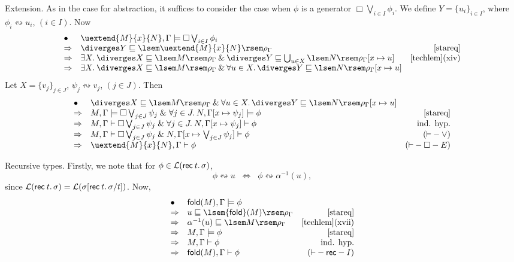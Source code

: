 Extension.
As in the case for abstraction, it suffices to consider the case when $\phi$ is a generator $\Box \bigvee_{i \in I}\phi_{i}$.
We define $Y = \{ u_{i} \}_{i \in I}$, where $\phi_{i} \leftrightsquigarrow u_{i}$, $(i \in I)$.
Now
\[ \begin{array}{llr}
\bullet & \uextend{M}{x}{N}, \Gamma \models \Box \bigvee_{i \in I} \phi_{i} & \\
\Rightarrow & \diverges Y \sqsubseteq \lsem \uextend{M}{x}{N} \rsem \rho_{\Gamma} & \ref{stareq} \\
\Rightarrow & \exists X. \: \diverges X \sqsubseteq \lsem M \rsem \rho_{\Gamma} \: \& \: \diverges Y \sqsubseteq \bigcup_{u \in X} \lsem N \rsem \rho_{\Gamma}[x \mapsto u] & \mbox{\ref{techlem}(xiv)} \\
\Rightarrow & \exists X. \: \diverges X \sqsubseteq \lsem M \rsem \rho_{\Gamma} \: \& \: \forall u \in X. \, \diverges Y \sqsubseteq \lsem N \rsem \rho_{\Gamma}[x \mapsto u] & 
\end{array} \]
Let $X = \{ v_{j} \}_{j \in J}$, $\psi_{j} \leftrightsquigarrow v_{j}$, $(j \in J)$. Then
\[ \begin{array}{llr}
\bullet &  \diverges X \sqsubseteq \lsem M \rsem \rho_{\Gamma} \: \& \: \forall u \in X. \, \diverges Y \sqsubseteq \lsem N \rsem \rho_{\Gamma}[x \mapsto u] & \\
\Rightarrow & M, \Gamma \models \Box \bigvee_{j \in J} \psi_{j} \; \& \; \forall j \in J. \: N, \Gamma [x \mapsto \psi_{j}] \models \phi & \ref{stareq} \\
\Rightarrow & M, \Gamma \vdash \Box \bigvee_{j \in J} \psi_{j} \; \& \; \forall j \in J. \: N, \Gamma [x \mapsto \psi_{j}] \vdash \phi & \mbox{ind. hyp.} \\
\Rightarrow & M, \Gamma \vdash \Box \bigvee_{j \in J} \psi_{j} \; \& \; N, \Gamma [x \mapsto \bigvee_{j \in J} \psi_{j}] \vdash \phi & ({\vdash}-{\vee}) \\
\Rightarrow & \uextend{M}{x}{N}, \Gamma \vdash  \phi & ({\vdash}-{\Box}-E)
\end{array} \]

Recursive types.
Firstly, we note that for $\phi \in {\cal L}({\sf rec} \: t. \, \sigma )$,
\[ \phi \leftrightsquigarrow u \;\; \Leftrightarrow \;\; \phi \leftrightsquigarrow \alpha^{-1}(u) , \]
since ${\cal L}({\sf rec} \: t. \, \sigma ) = {\cal L}(\sigma 
[{\sf rec} \: t. \,
\sigma /t])$.
Now,
\[ \begin{array}{llr}
\bullet & {\sf fold}(M), \Gamma \models \phi & \\
\Rightarrow & u \sqsubseteq \lsem {\sf fold}(M) \rsem \rho_{\Gamma} & \ref{stareq} \\
\Rightarrow & \alpha^{-1}(u) \sqsubseteq \lsem M \rsem \rho_{\Gamma} & \mbox{\ref{techlem}(xvii)} \\
\Rightarrow & M, \Gamma \models \phi & \ref{stareq} \\
\Rightarrow & M, \Gamma \vdash \phi & \mbox{ind. hyp.} \\
\Rightarrow & {\sf fold}(M), \Gamma \vdash \phi & ({\vdash}-{\sf rec}-I)
\end{array} \]

